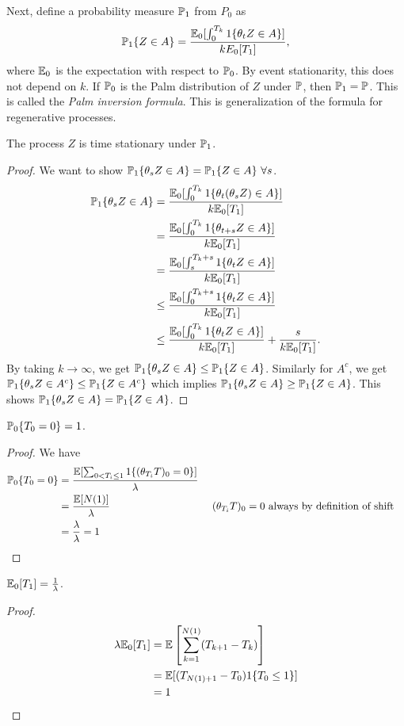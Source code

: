 \documentclass[all-lectures.tex]{subfiles}
\begin{document}
\indent Next, define a probability measure $\P_1$ from $P_0$ as 
\begin{align*}
\P_1\{Z \in A\} = \frac{\E_0[\int_0^{T_k} 1\{\theta_t Z \in A\}]}{k E_0[T_1]},
\end{align*}
where $\E_0$ is the expectation with respect to $\P_0$. By event stationarity, this does not depend on $k$. If $\P_0$ is the Palm distribution of $Z$ under $\P$, then $\P_1 = \P$. This is called the \textit{Palm inversion formula}. This is generalization of the formula for regenerative processes. 
\begin{prop}
The process $Z$ is time stationary under $\P_1$.
\begin{proof}
We want to show $\P_1\{\theta_s Z\in A \} = \P_1\{Z \in A\}\ \forall s$.
\begin{align*}
\P_1\{\theta_s Z \in A \} &= \frac{\E_0[\int_0^{T_k} 1\{\theta_t (\theta_s Z) \in A\}]}{k \E_0[T_1]} \\
&= \frac{\E_0[\int_0^{T_k} 1\{\theta_{t+s} Z \in A\}]}{k \E_0[T_1]} \\
&= \frac{\E_0[\int_s^{T_k+s} 1\{\theta_t Z \in A\}]}{k \E_0[T_1]}  \\
&\leq \frac{\E_0[\int_0^{T_k+s} 1\{\theta_t Z \in A\}]}{k \E_0[T_1]}  \\
&\leq \frac{\E_0[\int_0^{T_k} 1\{\theta_t Z \in A\}]}{k \E_0[T_1]}  + \frac{s}{k \E_0[T_1]}. \\
\end{align*}
By taking $k\to \infty$, we get $\P_1\{\theta_s Z\in A \} \leq \P_1\{Z \in A\}$. Similarly for $A^c$, we get $\P_1\{\theta_s Z\in A^c \} \leq \P_1\{Z \in A^c\}$ which implies $\P_1\{\theta_s Z\in A \} \geq \P_1\{Z \in A\}$. This shows $\P_1\{\theta_s Z\in A \} = \P_1\{Z \in A\}$.
\end{proof}
\end{prop}
\begin{lem}
$\P_0\{T_0 =0\} = 1$.
\begin{proof} We have
\begin{align*}
\P_0\{T_0 =0\} &= \frac{\E[\sum_{0 < T_i \leq 1} 1\{(\theta_{T_i} T)_0 = 0\}]}{\lambda} \\
&= \frac{\E[N(1)] }{\lambda} && \text{ $(\theta_{T_i} T)_0 = 0$ always by definition of shift}\\
&= \frac{\lambda}{\lambda} = 1 && \qedhere 
\end{align*}
\end{proof}
\end{lem}
\begin{lem}
$\E_0[T_1] = \frac{1}{\lambda}$.
\begin{proof}
\begin{align*}
\lambda \E_0[T_1] &= \E\left[ \sum_{k=1}^{N(1)} (T_{k+1} - T_k)\right] \\
&= \E[ (T_{N(1)+1} - T_0) 1\{T_0 \leq 1\}] \\
&= 1 \qedhere
\end{align*}
\end{proof}
\end{lem}
\end{document}
